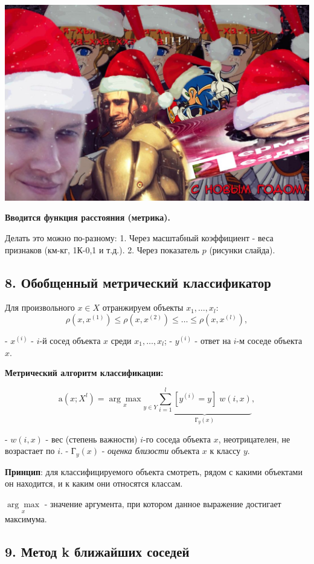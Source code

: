 \includegraphics[scale=0.3]{figures/samplefigure.jpg}

\textbf{Вводится функция расстояния (метрика).}

Делать это можно по-разному:
1. Через масштабный коэффициент - веса признаков (км-кг, 1К-0,1 и т.д.).
2. Через показатель $p$ (рисунки слайда).

\subsection{8. Обобщенный метрический классификатор}

Для произвольного $x \in X$ отранжируем объекты $x_1, \ldots, x_l$:
$$\rho(x, x^{(1)}) \leqslant \rho(x, x^{(2)}) \leqslant \ldots \leqslant
\rho(x, x^{(l)}),$$

- $x^{(i)}$ - $i$-й сосед объекта $x$ среди $x_1, \ldots, x_l$;
- $y^{(i)}$ - ответ на $i$-м соседе объекта $x$.

\textbf{Метрический алгоритм классификации:}

$$\displaystyle \text{a}(x;X^l) = {\underset{x}{\arg\max}}_{y \in Y} \underbrace{\sum^l_{i=1}
{[y^{(i)} = y] \; w(i, x)}}_{Г_y(x)},$$

- $w(i,x)$ - вес (степень важности) $i$-го соседа объекта $x$,
неотрицателен, не возрастает по $i$.
- $Г_y(x)$ - \textit{оценка близости} объекта $x$ к классу $y$.

\textbf{Принцип}:
для классифицируемого объекта смотреть, рядом с какими объектами он
находится, и к каким они относятся классам.

${\underset{x}{\arg\max}}$ - значение аргумента, при котором данное выражение достигает
максимума.

\subsection{9. Метод k ближайших соседей}

